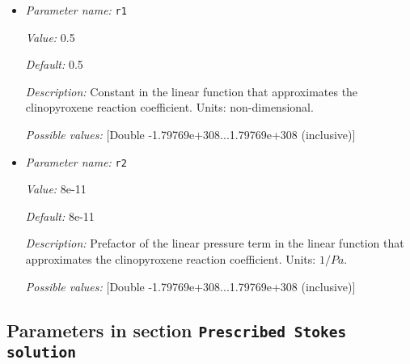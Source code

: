 \begin{itemize}
{\it Value:} 1.5


{\it Default:} 1.5


{\it Description:} Exponent of the melting temperature in the melt fraction calculation. Units: non-dimensional.


{\it Possible values:} [Double -1.79769e+308...1.79769e+308 (inclusive)]
\item {\it Parameter name:} {\tt r1}
\label{parameters:Postprocess/Visualization/Melt fraction/r1}


{\it Value:} 0.5


{\it Default:} 0.5


{\it Description:} Constant in the linear function that approximates the clinopyroxene reaction coefficient. Units: non-dimensional.


{\it Possible values:} [Double -1.79769e+308...1.79769e+308 (inclusive)]
\item {\it Parameter name:} {\tt r2}
\label{parameters:Postprocess/Visualization/Melt fraction/r2}


{\it Value:} 8e-11


{\it Default:} 8e-11


{\it Description:} Prefactor of the linear pressure term in the linear function that approximates the clinopyroxene reaction coefficient. Units: $1/Pa$.


{\it Possible values:} [Double -1.79769e+308...1.79769e+308 (inclusive)]
\end{itemize}

\subsection{Parameters in section \tt Prescribed Stokes solution}
\label{parameters:Prescribed_20Stokes_20solution}

